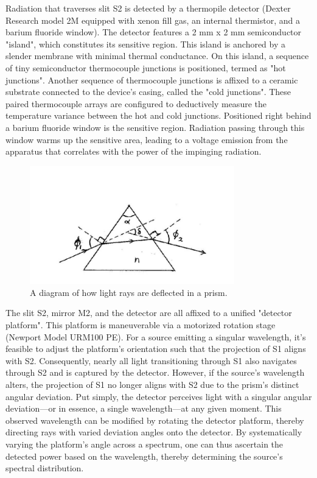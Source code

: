 \documentclass[10pt,letterpaper,onecolumn]{article}
\begin{document}
 
Radiation that traverses slit S2 is detected by a thermopile detector 
(Dexter Research model 2M equipped with xenon fill gas, an internal thermistor, 
and a barium fluoride window). The detector features a 2 mm x 2 mm 
semiconductor "island", which constitutes 
its sensitive region. This island is anchored by a slender membrane with minimal 
thermal conductance. On this island, a sequence of tiny semiconductor thermocouple 
junctions is positioned, termed as "hot junctions". Another sequence of thermocouple 
junctions is affixed to a ceramic substrate connected to the device's casing, 
called the "cold junctions". These paired thermocouple arrays are configured to 
deductively measure the temperature variance between the hot and cold junctions. 
Positioned right behind a barium fluoride window is the sensitive region. Radiation 
passing through this window warms up the sensitive area, leading to a voltage 
emission from the apparatus that correlates with the power of the impinging radiation.
\begin{figure}[ht]
  \begin{center}
  \includegraphics*[width=3.5in]{Apparatus_3.jpg}
  \caption{A diagram of how light rays are deflected in a prism.\label{fig:apparatus_3} }
  \end{center}
 \end{figure}
The slit S2, mirror M2, and the detector are all affixed to a unified "detector platform". 
This platform is maneuverable via a motorized rotation stage (Newport Model URM100 PE). 
For a source emitting a singular wavelength, it's feasible to adjust the platform's 
orientation such that the projection of S1 aligns with S2. Consequently, nearly all light 
transitioning through S1 also navigates through S2 and is captured by the detector. 
However, if the source's wavelength alters, the projection of S1 no longer aligns with S2 
due to the prism's distinct angular deviation. Put simply, the detector perceives light 
with a singular angular deviation—or in essence, a single wavelength—at any given moment. 
This observed wavelength can be modified by rotating the detector platform, thereby directing 
rays with varied deviation angles onto the detector. By systematically varying the platform's 
angle across a spectrum, one can thus ascertain the detected power based on the wavelength, 
thereby determining the source's spectral distribution.
\end{document}

